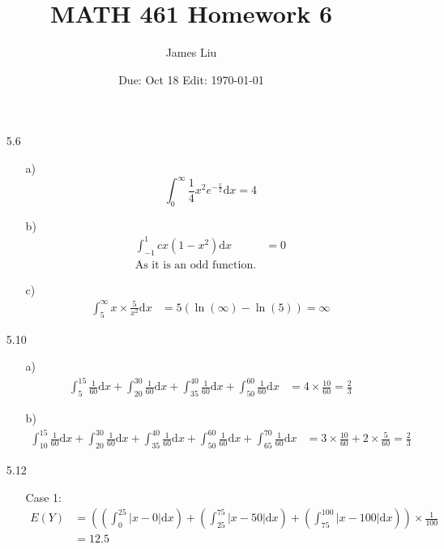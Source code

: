 \documentclass{article}
\date{Due: Oct 18 Edit: \today}
\title{MATH 461 Homework 6}
\author{James Liu}
\begin{document}
\maketitle
\begin{itemize}
    \item [5.6]
    \begin{itemize}
        \item [a)]
        \[\int_{0}^{\infty}\frac{1}{4}x^2e^{-\frac{x}{2}}\text{d}x=4\]
        \item [b)]
        \begin{align*}
            \int_{-1}^{1}cx(1-x^2)\text{d}x &= 0\\
            \text{As it is an odd function.}
        \end{align*}
        \item [c)]
        \begin{align*}
            \int_{5}^{\infty} x\times \frac{5}{x^2}\text{d}x&=5(\ln(\infty)-\ln(5))=\infty
        \end{align*}
    \end{itemize}
    \item [5.10]
    \begin{itemize}
        \item [a)]
        \begin{align*}
            \int_{5}^{15}\frac{1}{60}\text{d}x+\int_{20}^{30}\frac{1}{60}\text{d}x+\int_{35}^{40}\frac{1}{60}\text{d}x+\int_{50}^{60}\frac{1}{60}\text{d}x&= 4\times \frac{10}{60}=\frac{2}{3}
        \end{align*}
        \item [b)]
        \begin{align*}
            \int_{10}^{15}\frac{1}{60}\text{d}x+\int_{20}^{30}\frac{1}{60}\text{d}x+\int_{35}^{40}\frac{1}{60}\text{d}x+\int_{50}^{60}\frac{1}{60}\text{d}x+\int_{65}^{70}\frac{1}{60}\text{d}x&= 3\times \frac{10}{60}+2\times\frac{5}{60}=\frac{2}{3}
        \end{align*}
    \end{itemize}
    \item [5.12] \
    \begin{itemize}
        \item [Case 1:]
        \begin{align*}
        E(Y)&= \left(\left(\int_{0}^{25}|x-0|\text{d}x\right)+\left(\int_{25}^{75}|x-50|\text{d}x\right)+\left(\int_{75}^{100}|x-100|\text{d}x\right)\right)\times \frac{1}{100}\\
            &= 12.5
        \end{align*}

\end{itemize}
\end{itemize}
\end{document}
